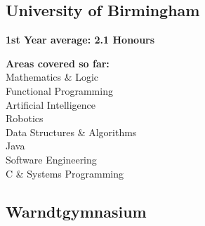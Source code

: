 \documentclass[]{jonas-cv}
\begin{document}
%
%
\lastupdated

%
%

%
%

\begin{minipage}[t]{0.34\textwidth} 



\subsection{University of Birmingham}
\sectionsep

\begin{tightemize}
    \item \textbf{1st Year average: 2.1 Honours}
    \item \textbf{Areas covered so far:}\\
    Mathematics \& Logic \\
    Functional Programming \\
    Artificial Intelligence \\
    Robotics \\
    Data Structures \& Algorithms \\
    Java \\
    Software Engineering \\
    C \& Systems Programming \\
\end{tightemize}
\largesectionsep


\subsection{Warndtgymnasium}


\end{minipage}
\end{document}
